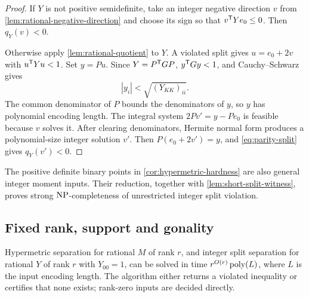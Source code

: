 \begin{proof}
If $Y$ is not positive semidefinite, take an integer negative direction
$v$ from \cref{lem:rational-negative-direction} and choose its sign so
that $v^{\mathsf T} Ye_0\le0$. Then $q_Y(v)<0$.

Otherwise apply \cref{lem:rational-quotient} to $Y$. A violated split gives
$u=e_0+2v$ with $u^{\mathsf T} Yu<1$. Set $y=Pu$. Since $Y=P^{\mathsf T} GP$,
$y^{\mathsf T} Gy<1$, and Cauchy--Schwarz gives
\[
 |y_i|<\sqrt{(Y_{KK})_{ii}}.
\]
The common denominator of $P$ bounds the denominators of $y$, so $y$ has
polynomial encoding length. The integral system
$2Pv'=y-Pe_0$ is feasible because $v$ solves it. After clearing
denominators, Hermite normal form produces a polynomial-size integer
solution $v'$. Then $P(e_0+2v')=y$, and
\eqref{eq:parity-split} gives $q_Y(v')<0$.
\end{proof}

The positive definite binary points in \cref{cor:hypermetric-hardness}
are also general integer moment inputs. Their reduction, together with
\cref{lem:short-split-witness}, proves strong $\mathrm{NP}$-completeness of
unrestricted integer split violation.

\subsection{Fixed rank, support and gonality}

\begin{theorem}\label{thm:rank-separation}
Hypermetric separation for rational $M$ of rank $r$, and integer split
separation for rational $Y$ of rank $r$ with $Y_{00}=1$, can be solved in
time $r^{O(r)}\operatorname{poly}(L)$, where $L$ is the input encoding length. The
algorithm either returns a violated inequality or certifies that none
exists; rank-zero inputs are decided directly.
\end{theorem}

